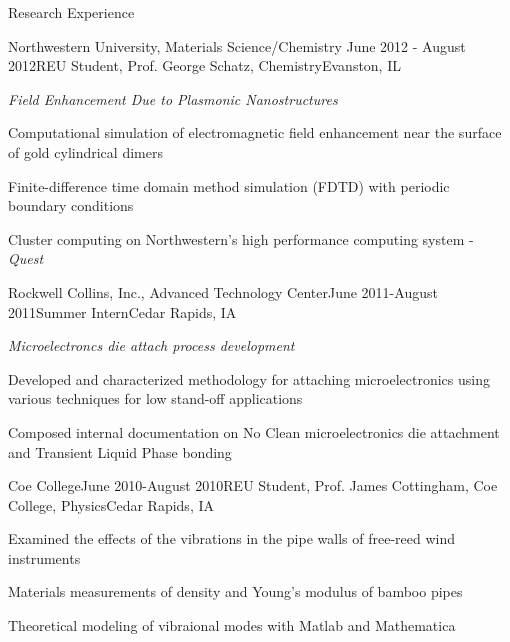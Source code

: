 \documentclass{resume} %
\begin{document}
\begin{rSection}{Research Experience}
\begin{rSubsection}{Northwestern University, Materials Science/Chemistry }{June 2012 - August 2012}{REU Student, Prof. George Schatz, Chemistry}{Evanston, IL}
\item {\em Field Enhancement Due to Plasmonic Nanostructures}
\item Computational simulation of electromagnetic field enhancement near the surface of gold cylindrical dimers
\item Finite-difference time domain method simulation (FDTD) with periodic boundary conditions 
\item Cluster computing on Northwestern's high performance computing system - {\em Quest}
\end{rSubsection}


\begin{rSubsection}{Rockwell Collins, Inc., Advanced Technology Center}{June 2011-August 2011}{Summer Intern}{Cedar Rapids, IA}
\item {\em Microelectroncs die attach process development}
\item Developed and characterized methodology for attaching microelectronics using various techniques for low stand-off applications
\item Composed internal documentation on No Clean microelectronics die attachment and Transient Liquid Phase bonding
\end{rSubsection}


\begin{rSubsection}{Coe College}{June 2010-August 2010}{REU Student, Prof. James Cottingham, Coe College, Physics}{Cedar Rapids, IA}
\item Examined the effects of the vibrations in the pipe walls of free-reed wind instruments
\item Materials measurements of density and Young's modulus of bamboo pipes
\item Theoretical modeling of vibraional modes with Matlab and Mathematica
\end{rSubsection}

\end{rSection}
\end{document}
